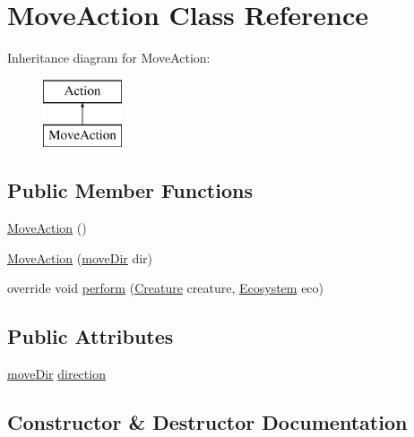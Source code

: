 \hypertarget{class_move_action}{}\section{Move\+Action Class Reference}
\label{class_move_action}
Inheritance diagram for Move\+Action\+:\begin{figure}[H]
\begin{center}
\leavevmode
\includegraphics[height=2.000000cm]{class_move_action}
\end{center}
\end{figure}
\subsection*{Public Member Functions}
\begin{DoxyCompactItemize}
\item 
\mbox{\hyperlink{class_move_action_a163a34639a00dba4969c45ded4a9bf2f}{Move\+Action}} ()
\item 
\mbox{\hyperlink{class_move_action_afff0c610e50f431d268386ed848640fd}{Move\+Action}} (\mbox{\hyperlink{_move_action_8cs_a9e4683fdca765fb08e2d0e5f7f57c162}{move\+Dir}} dir)
\item 
override void \mbox{\hyperlink{class_move_action_a259b4b4542e7f72df322e060d7737f71}{perform}} (\mbox{\hyperlink{class_creature}{Creature}} creature, \mbox{\hyperlink{class_ecosystem}{Ecosystem}} eco)
\end{DoxyCompactItemize}
\subsection*{Public Attributes}
\begin{DoxyCompactItemize}
\item 
\mbox{\hyperlink{_move_action_8cs_a9e4683fdca765fb08e2d0e5f7f57c162}{move\+Dir}} \mbox{\hyperlink{class_move_action_af0fa977f226987c01b843163799c747a}{direction}}
\end{DoxyCompactItemize}


\subsection{Constructor \& Destructor Documentation}
\mbox{\label{class_move_action_a163a34639a00dba4969c45ded4a9bf2f}} 

